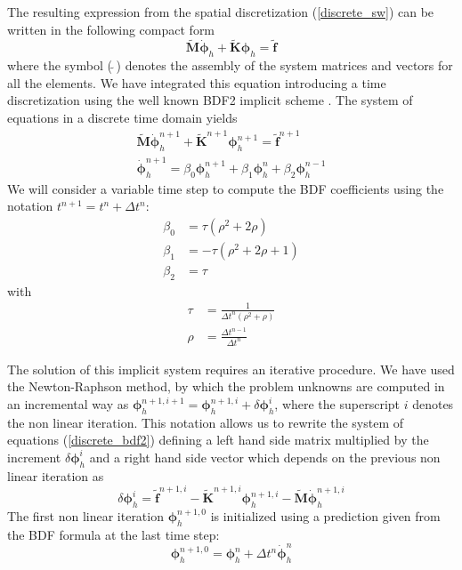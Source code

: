 The resulting expression from the spatial discretization (\ref{discrete_sw}) can be written in the following compact form 
\begin{equation} \label{discrete_compact}
\tilde{\mathbf{M}}\dot{\bm{\phi}}_h + \tilde{\mathbf{K}}\bm{\phi}_h = \tilde{\mathbf{f}}
\end{equation}
where the symbol ($\,\tilde{}\,$) denotes the assembly of the system matrices and vectors for all the elements.
We have integrated this equation introducing a time discretization using the well known BDF2 implicit scheme \cite{curtiss1952,brayton1972}. The system of equations in a discrete time domain yields
\begin{equation}
\begin{split} \label{discrete_bdf2}
\tilde{\mathbf{M}}\dot{\bm{\phi}}_h^{n+1} + \tilde{\mathbf{K}}^{n+1}\bm{\phi}_h^{n+1} = \tilde{\mathbf{f}}^{n+1} \\
\dot{\bm{\phi}}_h^{n+1} = \beta_0 \bm{\phi}_h^{n+1} + \beta_1 \bm{\phi}_h^n + \beta_2 \bm{\phi}_h^{n-1}
\end{split}
\end{equation}
We will consider a variable time step to compute the BDF coefficients using the notation $t^{n+1} = t^n + \Delta t^n$:
\begin{equation}
\begin{split}
\beta_0 &= \tau (\rho^2 + 2\rho) \\
\beta_1 &= -\tau (\rho^2 + 2\rho + 1) \\
\beta_2 &= \tau
\end{split}
\end{equation}
with
\begin{equation}
\begin{split}
\tau &= \frac{1}{\Delta t^n(\rho^2 + \rho)} \\
\rho &= \frac{\Delta t^{n-1}}{\Delta t^n}
\end{split}
\end{equation}

The solution of this implicit system requires an iterative procedure. We have used the Newton-Raphson method, by which the problem unknowns are computed in an incremental way as
$\bm{\phi}_h^{n+1,i+1} = \bm{\phi}_h^{n+1,i} + \delta\bm{\phi}_h^i$,
where the superscript $i$ denotes the non linear iteration.
This notation allows us to rewrite the system of equations (\ref{discrete_bdf2}) defining a left hand side matrix multiplied by the increment $\delta\bm{\phi}_h^i$ and a right hand side vector which depends on the previous non linear iteration as
\begin{equation}
[\beta_0\tilde{\mathbf{M}} + \tilde{\mathbf{K}}^{n+1,i}] \delta\bm{\phi}_h^i
= \tilde{\mathbf{f}}^{n+1,i} - \tilde{\mathbf{K}}^{n+1,i}\bm{\phi}_h^{n+1,i} - \tilde{\mathbf{M}}\dot{\bm{\phi}}_h^{n+1,i}
\end{equation}
The first non linear iteration $\bm{\phi}_h^{n+1,0}$ is initialized using a prediction given from the BDF formula at the last time step:
\begin{equation}
\bm{\phi}_h^{n+1,0} = \bm{\phi}_h^n + \Delta t^n \dot{\bm{\phi}}_h^{n}
\end{equation}


